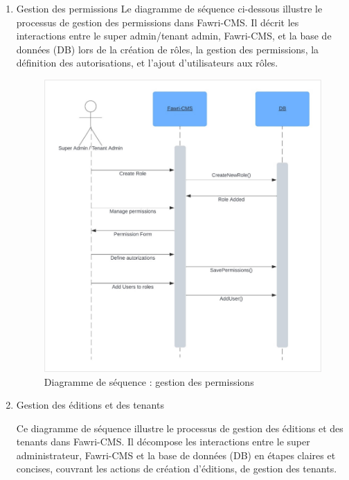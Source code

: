 \begin{enumerate}
  \item Gestion des permissions
        \hspace{\parindent}Le diagramme de séquence ci-dessous illustre le processus de gestion des permissions dans Fawri-CMS. Il décrit les interactions entre le super admin/tenant admin, Fawri-CMS, et la base de données (DB) lors de la création de rôles, la gestion des permissions, la définition des autorisations, et l'ajout d'utilisateurs aux rôles.
        \begin{figure}[H]
          \centering
          \includegraphics[width=11cm]{Figures/diagsec_Gestion_permissions.png}
          \caption{Diagramme de séquence : gestion des permissions}
        \end{figure}



  \item Gestion des éditions et des tenants

        \hspace{\parindent}Ce diagramme de séquence illustre le processus de gestion des éditions et des tenants dans Fawri-CMS. Il décompose les interactions entre le super administrateur, Fawri-CMS et la base de données (DB) en étapes claires et concises, couvrant les actions de création d'éditions, de gestion des tenants.


\end{enumerate}
